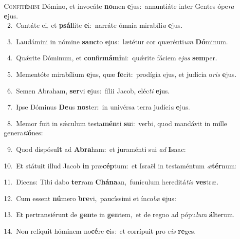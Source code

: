 \lettrine{\initial\textcolor{\initialcolor}{C}}{onfitémini} Dómino, et invocáte \textbf{no}\-men \textbf{e}\-jus:~\star annuntiáte inter Gentes ópe\textit{ra} \textbf{e}\-jus.\\
{\numbfont\textcolor{\numbcolor}{~2.}}~Cantáte ei, et \textbf{psál}\-lite \textbf{e}\-i:~\star narráte ómnia mirabíli\textit{a} \textbf{e}\-jus.\par
{\numbfont\textcolor{\numbcolor}{~3.}}~Laudámini in nómine \textbf{sanc}\-to \textbf{e}\-jus:~\star lætétur cor quærénti\textit{um} \textbf{Dó}\-minum.\par
{\numbfont\textcolor{\numbcolor}{~4.}}~Quǽrite Dóminum, et \textbf{con}\-fir\-\textbf{má}\-\textbf{mi}ni:~\star quǽrite fáciem e\textit{jus} \textbf{sem}\-per.\par
{\numbfont\textcolor{\numbcolor}{~5.}}~Mementóte mirabílium \textbf{e}\-jus, quæ \textbf{fe}\-cit:~\star prodígia ejus, et judícia o\textit{ris} \textbf{e}\-jus.\par
{\numbfont\textcolor{\numbcolor}{~6.}}~Semen Abraham, \textbf{ser}\-vi \textbf{e}\-jus:~\star fílii Jacob, eléc\textit{ti} \textbf{e}\-jus.\par
{\numbfont\textcolor{\numbcolor}{~7.}}~Ipse Dóminus \textbf{De}\-us \textbf{nos}\-ter:~\star in univérsa terra judíci\textit{a} \textbf{e}\-jus.\par
{\numbfont\textcolor{\numbcolor}{~8.}}~Memor fuit in sǽculum testa\-\textbf{mén}\-ti \textbf{su}\-i:~\star verbi, quod mandávit in mille genera\-\textit{ti}\-\textbf{ó}nes:\par
{\numbfont\textcolor{\numbcolor}{~9.}}~Quod dispósu\textbf{it} ad \textbf{A}\-\textbf{bra}ham:~\star et juraménti sui \textit{ad} \textbf{I}\-saac:\par
{\numbfont\textcolor{\numbcolor}{10.}}~Et státuit illud Jacob \textbf{in} præ\-\textbf{cép}\-tum:~\star et Israël in testaméntum \textit{æ}\-\textbf{tér}num:\par
{\numbfont\textcolor{\numbcolor}{11.}}~Dicens: Tibi dabo \textbf{ter}\-ram \textbf{Chá}\-\textbf{na}an,~\star funículum hereditá\textit{tis} \textbf{ves}\-træ.\par
{\numbfont\textcolor{\numbcolor}{12.}}~Cum essent \textbf{nú}\-mero \textbf{bre}\-vi,~\star paucíssimi et ínco\textit{læ} \textbf{e}\-jus:\par
{\numbfont\textcolor{\numbcolor}{13.}}~Et pertransiérunt de \textbf{gen}\-te in \textbf{gen}\-tem,~\star et de regno ad pópu\textit{lum} \textbf{ál}\-terum.\par
{\numbfont\textcolor{\numbcolor}{14.}}~Non relíquit hóminem no\-\textbf{cé}\-re \textbf{e}\-is:~\star et corrípuit pro e\textit{is} \textbf{re}\-ges.\par
